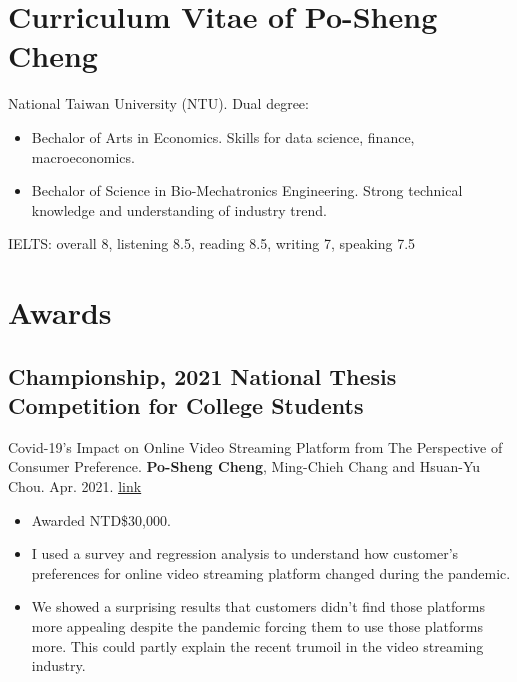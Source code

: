 \documentclass[12pt]{article}
\begin{document}
    \section*{Curriculum Vitae of Po-Sheng Cheng} 
    {\sffamily
    National Taiwan University (NTU). Dual degree:
    \begin{itemize}
        \item Bechalor of Arts in Economics. Skills for data science, finance, macroeconomics.
        \item Bechalor of Science in Bio-Mechatronics Engineering. Strong technical knowledge and understanding of industry trend.
    \end{itemize}
    IELTS: overall 8, listening 8.5, reading 8.5, writing 7, speaking 7.5
    }
    \section*{Awards}
        \subsection*{Championship, 2021 National Thesis Competition for College Students}
        {\sffamily
        {\footnotesize Covid-19's Impact on Online Video Streaming Platform from The Perspective of Consumer Preference. \textbf{Po-Sheng Cheng}, Ming-Chieh Chang and Hsuan-Yu Chou. Apr. 2021. \href{https://bencer3283.github.io/experiences/covidthesis/}{\underline{link}}}
        \begin{itemize}
            \item Awarded NTD\$30,000.
            \item I used a survey and regression analysis to understand how customer's preferences for online video streaming platform changed during the pandemic.
            \item We showed a surprising results that customers didn't find those platforms more appealing despite the pandemic forcing them to use those platforms more.
            This could partly explain the recent trumoil in the video streaming industry. 
        \end{itemize}
        }
\end{document}
